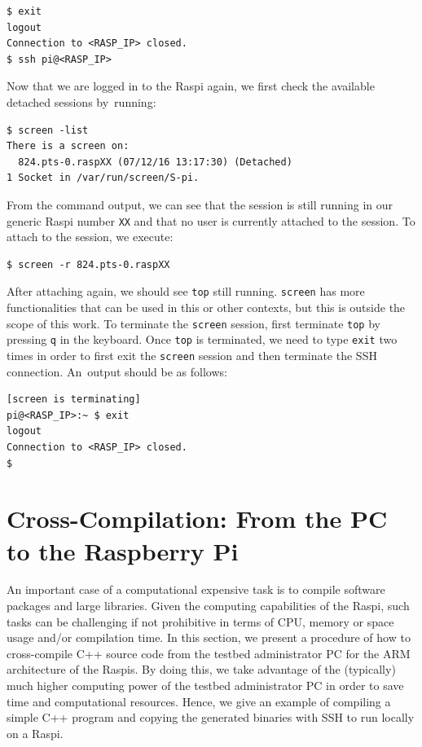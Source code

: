\documentclass[electronics,article,accept,moreauthors,pdftex,10pt,a4paper]{mdpi}
\theoremstyle{mdpi}
\newcounter{ex}
\newcounter{re}
\theoremstyle{mdpidefinition}
\begin{document}
\begin{lstlisting}[]
$ exit
logout
Connection to <RASP_IP> closed.
$ ssh pi@<RASP_IP>
\end{lstlisting}
\FloatBarrier
\vspace{-5mm}

Now that we are logged in to the Raspi again, we first check the
available detached sessions by~running:
\begin{lstlisting}[]
$ screen -list
There is a screen on:
  824.pts-0.raspXX (07/12/16 13:17:30) (Detached)
1 Socket in /var/run/screen/S-pi.
\end{lstlisting}
\FloatBarrier
\vspace{-5mm}

From the command output, we can see that the session is still running in our
generic Raspi number \texttt{XX} and that no user is currently attached
to the session. To attach to the session, we execute:

\begin{lstlisting}[]
$ screen -r 824.pts-0.raspXX
\end{lstlisting}
\FloatBarrier
\vspace{-5mm}

After attaching again, we should see \texttt{top} still running.
\texttt{screen} has more functionalities that can be used in this
or other contexts, but this is outside the scope of this work.
To terminate the \texttt{screen} session, first terminate \texttt{top}
by pressing \texttt{q} in the keyboard.
Once \texttt{top} is terminated,
we need to type \texttt{exit} two times in order to first exit the
\texttt{screen} session and then terminate the SSH connection.
An~output should be as follows:


\begin{lstlisting}[]
[screen is terminating]
pi@<RASP_IP>:~ $ exit
logout
Connection to <RASP_IP> closed.
$
\end{lstlisting}
\FloatBarrier
\vspace{-5mm}


\section{Cross-Compilation: From the PC to the Raspberry Pi}
%

\label{sec:cross_compilation}
An important case of a computational expensive task is to compile software
packages and large libraries. Given the computing capabilities of the
Raspi, such tasks can be challenging if not prohibitive in terms of
\ac{CPU}, memory or space usage and/or compilation time. In
this section, we present a procedure of how to cross-compile C++
source code from the testbed administrator PC for the ARM
architecture of the Raspis. By doing this, we take advantage
of the (typically) much higher computing power of the testbed
administrator PC in order to save time and computational resources.
Hence, we give an example of compiling a simple C++ program and
copying the generated binaries with SSH to run locally
on a Raspi.
\end{document}
